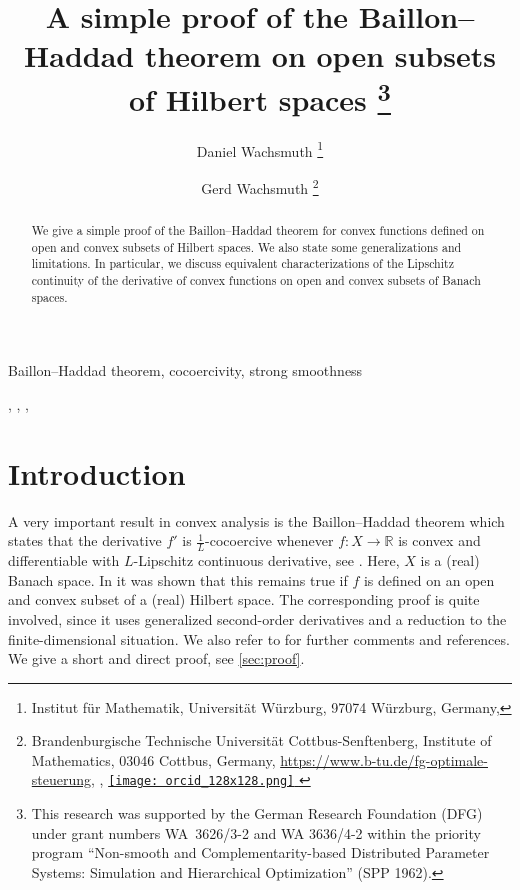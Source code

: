 \documentclass[
	english
]{scrartcl}
\numberwithin{equation}{section} %
\let\cite\parencite
\newcommand\R{\mathbb{R}}
\newcommand\orcid[1]{%
	\hspace{.25em}%
	\href{http://orcid.org/#1}{%
		\protect\texttt{[image: orcid\_128x128.png]}%
	}%
	\hspace{.25em}%
}
\begin{document}
\title{A simple proof of the Baillon--Haddad theorem on open subsets of Hilbert spaces%
\footnote{
This research was supported by the German Research Foundation (DFG) under grant numbers WA~3626/3-2 and WA 3636/4-2
 within the priority program ``Non-smooth and Complementarity-based Distributed Parameter
Systems: Simulation and Hierarchical Optimization'' (SPP 1962).}
}


\author{%
	Daniel Wachsmuth%
	\footnote{
		Institut f\"ur Mathematik,
		Universit\"at W\"urzburg,
		97074 W\"urzburg, Germany, 
	}
	\and
	Gerd Wachsmuth%
	\footnote{%
		Brandenburgische Technische Universität Cottbus-Senftenberg,
		Institute of Mathematics,
		03046 Cott\-bus, Germany,
		\url{https://www.b-tu.de/fg-optimale-steuerung},
		,
		\orcid{0000-0002-3098-1503}%
	}
}
\publishers{}
\maketitle

\begin{abstract}
	We give a simple proof of the Baillon--Haddad theorem
	for convex functions defined
	on open and convex subsets of Hilbert spaces.
	We also state some generalizations and limitations.
	In particular, we discuss equivalent characterizations of the
	Lipschitz continuity of the derivative of convex functions
	on open and convex subsets of Banach spaces.
\end{abstract}

\begin{keywords}
	Baillon--Haddad theorem,
	cocoercivity,
	strong smoothness
\end{keywords}

\begin{msc}
	,
	,
	,
\end{msc}

\section{Introduction}
\label{sec:intro}
A very important result in convex analysis is the
Baillon--Haddad theorem
which states
that the derivative $f'$ is $\frac1L$-cocoercive
whenever $f \colon X \to \R$
is convex and differentiable with $L$-Lipschitz continuous derivative,
see
\cite[Corollaire~10]{BaillonHaddad1977}.
Here, $X$ is a (real) Banach space.
In \cite[Theorem~3.1]{PerezArosVilches2019}
it was shown that this remains true
if $f$ is defined on an open and convex subset of a (real) Hilbert space.
The corresponding proof is quite involved,
since it uses generalized second-order derivatives
and a reduction to the finite-dimensional situation.
We also refer to \cite{BauschkeCombettes2009} for further comments and references.
We give a short and direct proof,
see \cref{sec:proof}.
\end{document}
